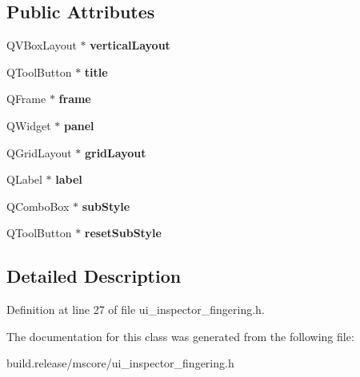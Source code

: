 \subsection*{Public Attributes}
\begin{DoxyCompactItemize}
\item 
\mbox{\label{class_ui___inspector_fingering_a0514498e936065a41403728cbf261277}} 
Q\+V\+Box\+Layout $\ast$ {\bfseries vertical\+Layout}
\item 
\mbox{\label{class_ui___inspector_fingering_a47067f6a25b6990ea7c03a446c5dd250}} 
Q\+Tool\+Button $\ast$ {\bfseries title}
\item 
\mbox{\label{class_ui___inspector_fingering_ad8aa28206be192033454db7820ccdfe7}} 
Q\+Frame $\ast$ {\bfseries frame}
\item 
\mbox{\label{class_ui___inspector_fingering_ae870c7ef5a5d96c1c3980fe2b4a53d24}} 
Q\+Widget $\ast$ {\bfseries panel}
\item 
\mbox{\label{class_ui___inspector_fingering_a7b7f6497440580cb8a0f7270ad98b135}} 
Q\+Grid\+Layout $\ast$ {\bfseries grid\+Layout}
\item 
\mbox{\label{class_ui___inspector_fingering_a4a4a9a6d217090e81c07d1be26115336}} 
Q\+Label $\ast$ {\bfseries label}
\item 
\mbox{\label{class_ui___inspector_fingering_acfb06c1d94127918d215cfb5b640c68f}} 
Q\+Combo\+Box $\ast$ {\bfseries sub\+Style}
\item 
\mbox{\label{class_ui___inspector_fingering_ab01881cd4c9a1c03994132fe3613d231}} 
Q\+Tool\+Button $\ast$ {\bfseries reset\+Sub\+Style}
\end{DoxyCompactItemize}


\subsection{Detailed Description}


Definition at line 27 of file ui\+\_\+inspector\+\_\+fingering.\+h.



The documentation for this class was generated from the following file\+:\begin{DoxyCompactItemize}
\item 
build.\+release/mscore/ui\+\_\+inspector\+\_\+fingering.\+h\end{DoxyCompactItemize}
